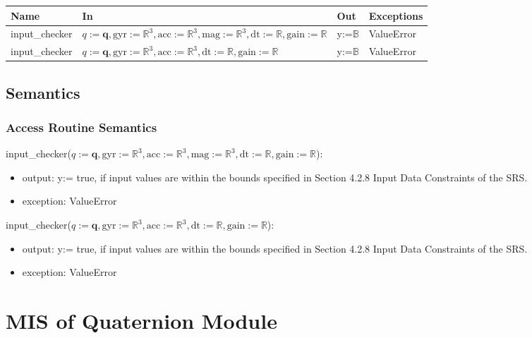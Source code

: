 \documentclass[12pt, titlepage]{article}
\begin{document}
\begin{center}
\begin{tabular}{p{3cm} p{8cm} p{1cm} p{2cm}}
\hline
\textbf{Name} & \textbf{In} & \textbf{Out} & \textbf{Exceptions} \\
\hline
input\_checker & $q:=\mathbf{q}, \text{gyr}:=\mathbb{R}^3, \text{acc}:=\mathbb{R}^3, \text{mag}:=\mathbb{R}^3, \text{dt}:=\mathbb{R}, \text{gain}:= \mathbb{R}$ & y:=$\mathbb{B}$ & ValueError \\
input\_checker & $q:=\mathbf{q}, \text{gyr}:=\mathbb{R}^3, \text{acc}:=\mathbb{R}^3, \text{dt}:=\mathbb{R}, \text{gain}:= \mathbb{R}$ & y:=$\mathbb{B}$ & ValueError \\
\hline
\end{tabular}
\end{center}

\subsection{Semantics}


\subsubsection{Access Routine Semantics}

\noindent input\_checker($q:=\mathbf{q}, \text{gyr}:=\mathbb{R}^3, \text{acc}:=\mathbb{R}^3, \text{mag}:=\mathbb{R}^3, \text{dt}:=\mathbb{R}, \text{gain}:= \mathbb{R}$):
\begin{itemize}
\item output: y:= true, if input values are within the bounds specified in Section 4.2.8 Input Data Constraints of the SRS.
\item exception: ValueError
\end{itemize}

\noindent input\_checker($q:=\mathbf{q}, \text{gyr}:=\mathbb{R}^3, \text{acc}:=\mathbb{R}^3, \text{dt}:=\mathbb{R}, \text{gain}:= \mathbb{R}$):
\begin{itemize}
\item output: y:= true, if input values are within the bounds specified in Section 4.2.8 Input Data Constraints of the SRS.
\item exception: ValueError
\end{itemize}

\newpage

\section{MIS of Quaternion Module} \label{qm}
\end{document}
